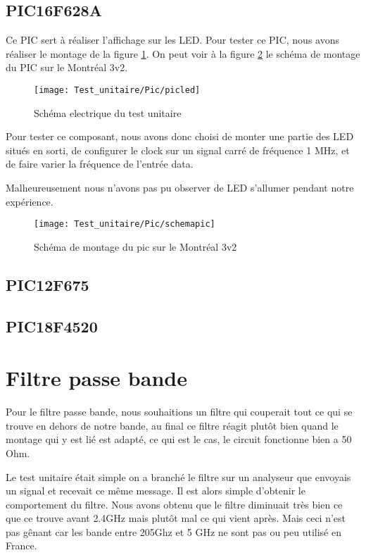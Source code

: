 \subsection{PIC16F628A}
\label{sec:picled}

Ce PIC sert à réaliser l'affichage sur les LED. Pour tester ce PIC, nous avons réaliser le montage de la figure \ref{fig:picled}. On peut voir à la figure \ref{fig:schemapic} le schéma de montage du PIC sur le Montréal 3v2.

\begin{figure}[!h]
  \centering
  \texttt{[image: Test\_unitaire/Pic/picled]}
  \caption{Schéma electrique du test unitaire}
  \label{fig:picled}
\end{figure}


Pour tester ce composant, nous avons donc choisi de monter une partie des LED situés en sorti, de configurer le \og clock\fg{} sur un signal carré de fréquence 1 MHz, et de faire varier la fréquence de l'entrée \og data\fg{}.

Malheureusement nous n'avons pas pu observer de LED s'allumer pendant notre expérience.

\begin{figure}[!h]
  \centering
  \texttt{[image: Test\_unitaire/Pic/schemapic]}
  \caption{Schéma de montage du pic sur le Montréal 3v2}
  \label{fig:schemapic}
\end{figure}
\newpage
\subsection{PIC12F675}
\label{sec:picclock}

\subsection{PIC18F4520}
\label{sec:piccontrol}


\section{Filtre passe bande}
\label{sec:passe_bande}


Pour le filtre passe bande, nous souhaitions un filtre qui couperait tout ce qui se trouve en dehors de notre bande, au final ce filtre réagit plutôt bien quand le montage qui y est lié est adapté, ce qui est le cas, le circuit fonctionne bien a 50 Ohm.

Le test unitaire était simple on a branché le filtre sur un analyseur que envoyais un signal et recevait ce même message. Il est alors simple d’obtenir le comportement du filtre. Nous avons obtenu que le filtre diminuait très bien ce que ce trouve avant 2.4GHz mais plutôt mal ce qui vient après. Mais ceci n’est pas gênant car les bande entre 205Ghz et 5 GHz ne sont pas ou peu utilisé en France.

